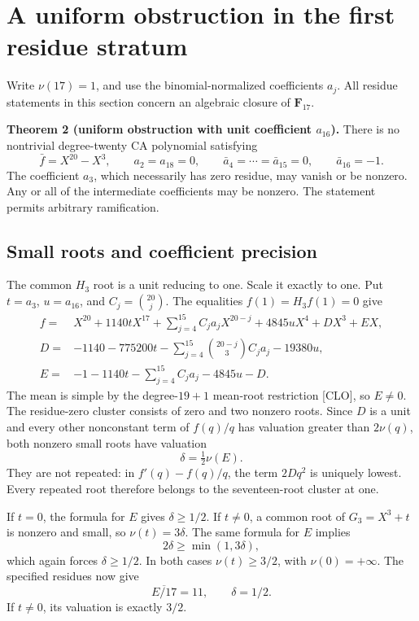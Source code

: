 \documentclass[
  british,
  10pt,
  a4paper,
]{article}
\begin{document}
\section{A uniform obstruction in the first residue
stratum}\label{a-uniform-obstruction-in-the-first-residue-stratum}

Write \(\nu(17)=1\), and use the binomial-normalized coefficients
\(a_j\). All residue statements in this section concern an algebraic
closure of \(\mathbf F_{17}\).

\textbf{Theorem 2 (uniform obstruction with unit coefficient
\(a_{16}\)).} There is no nontrivial degree-twenty CA polynomial
satisfying \[
 \bar f=X^{20}-X^3,\qquad a_2=a_{18}=0,\qquad
 \bar a_4=\cdots=\bar a_{15}=0,\qquad \bar a_{16}=-1.
\] The coefficient \(a_3\), which necessarily has zero residue, may
vanish or be nonzero. Any or all of the intermediate coefficients may be
nonzero. The statement permits arbitrary ramification.

\subsection{Small roots and coefficient
precision}\label{small-roots-and-coefficient-precision}

The common \(H_3\) root is a unit reducing to one. Scale it exactly to
one. Put \(t=a_3\), \(u=a_{16}\), and \(C_j=\binom{20}{j}\). The
equalities \(f(1)=H_3f(1)=0\) give \[
\begin{aligned}
f={}&X^{20}+1140tX^{17}
 +\sum_{j=4}^{15}C_ja_jX^{20-j}
 +4845uX^4+DX^3+EX,\\
D={}&-1140-775200t
 -\sum_{j=4}^{15}\binom{20-j}{3}C_ja_j-19380u,\\
E={}&-1-1140t-\sum_{j=4}^{15}C_ja_j-4845u-D.
\end{aligned}
\] The mean is simple by the degree-\(19+1\) mean-root restriction
{[}CLO{]}, so \(E\ne0\). The residue-zero cluster consists of zero and
two nonzero roots. Since \(D\) is a unit and every other nonconstant
term of \(f(q)/q\) has valuation greater than \(2\nu(q)\), both nonzero
small roots have valuation \[
\delta=\tfrac12\nu(E).
\] They are not repeated: in \(f'(q)-f(q)/q\), the term \(2Dq^2\) is
uniquely lowest. Every repeated root therefore belongs to the
seventeen-root cluster at one.

If \(t=0\), the formula for \(E\) gives \(\delta\ge1/2\). If \(t\ne0\),
a common root of \(G_3=X^3+t\) is nonzero and small, so
\(\nu(t)=3\delta\). The same formula for \(E\) implies \[
2\delta\ge\min(1,3\delta),
\] which again forces \(\delta\ge1/2\). In both cases \(\nu(t)\ge3/2\),
with \(\nu(0)=+\infty\). The specified residues now give \[
\overline{E/17}=11,
\qquad \delta=1/2.
\] If \(t\ne0\), its valuation is exactly \(3/2\).
\end{document}
